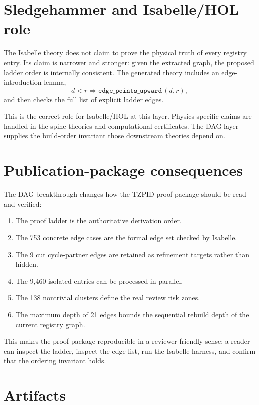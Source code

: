 \documentclass[11pt]{article}
\theoremstyle{remark}
\begin{document}
\section{Sledgehammer and Isabelle/HOL role}
\label{sec:isabelle}

The Isabelle theory does not claim to prove the physical truth of every registry entry. Its claim is narrower and stronger: given the extracted graph, the proposed ladder order is internally consistent. The generated theory includes an edge-introduction lemma,
\[
d < r \Longrightarrow \texttt{edge\_points\_upward}\,(d,r),
\]
and then checks the full list of explicit ladder edges.

This is the correct role for Isabelle/HOL at this layer. Physics-specific claims are handled in the spine theories and computational certificates. The DAG layer supplies the build-order invariant those downstream theories depend on.

\section{Publication-package consequences}
\label{sec:consequences}

The DAG breakthrough changes how the TZPID proof package should be read and verified:

\begin{enumerate}
  \item The proof ladder is the authoritative derivation order.
  \item The 753 concrete edge cases are the formal edge set checked by Isabelle.
  \item The 9 cut cycle-partner edges are retained as refinement targets rather than hidden.
  \item The 9,460 isolated entries can be processed in parallel.
  \item The 138 nontrivial clusters define the real review risk zones.
  \item The maximum depth of 21 edges bounds the sequential rebuild depth of the current registry graph.
\end{enumerate}

This makes the proof package reproducible in a reviewer-friendly sense: a reader can inspect the ladder, inspect the edge list, run the Isabelle harness, and confirm that the ordering invariant holds.

\section{Artifacts}
\label{sec:artifacts}
\end{document}
